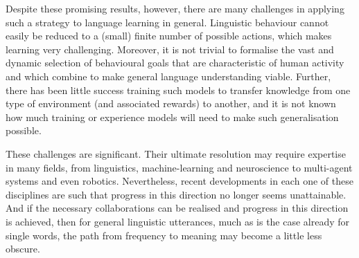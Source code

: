 Despite these promising results, however, there are many challenges in applying such a strategy to language learning in general. Linguistic behaviour cannot easily be reduced to a (small) finite number of possible actions, which makes learning very challenging. Moreover, it is not trivial to formalise the vast and dynamic selection of behavioural goals that are characteristic of human activity and which combine to make general language understanding viable. Further, there has been little success training such models to transfer knowledge from one type of environment (and associated rewards) to another, and it is not known how much training or experience models will need to make such generalisation possible. 

These challenges are significant. Their ultimate resolution may require expertise in many fields, from linguistics, machine-learning and neuroscience to multi-agent systems and even robotics. Nevertheless, recent developments in each one of these disciplines are such that progress in this direction no longer seems unattainable. And if the necessary collaborations can be realised and progress in this direction is achieved, then for general linguistic utterances, much as is the case already for single words, the path from frequency to meaning may become a little less obscure. 
